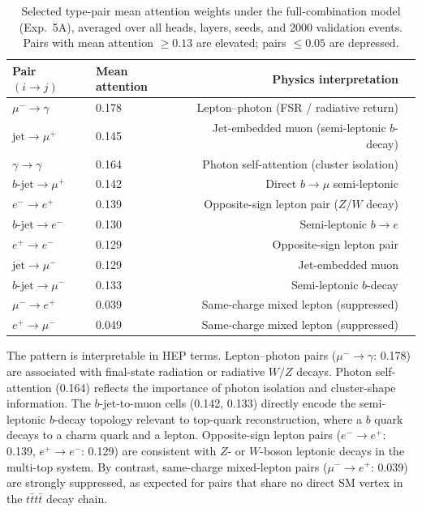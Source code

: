 \begin{table}[h]
\centering\small
\begin{tabular}{llrl}
\toprule
Pair $(i \to j)$ & Mean attention & Physics interpretation \\
\midrule
$\mu^- \to \gamma$   & 0.178 & Lepton--photon (FSR / radiative return) \\
$\text{jet} \to \mu^+$  & 0.145 & Jet-embedded muon (semi-leptonic $b$-decay) \\
$\gamma \to \gamma$  & 0.164 & Photon self-attention (cluster isolation) \\
$b\text{-jet} \to \mu^+$ & 0.142 & Direct $b \to \mu$ semi-leptonic \\
$e^- \to e^+$        & 0.139 & Opposite-sign lepton pair ($Z$/$W$ decay) \\
$b\text{-jet} \to e^-$ & 0.130 & Semi-leptonic $b \to e$ \\
$e^+ \to e^-$        & 0.129 & Opposite-sign lepton pair \\
$\text{jet} \to \mu^-$ & 0.129 & Jet-embedded muon \\
$b\text{-jet} \to \mu^-$ & 0.133 & Semi-leptonic $b$-decay \\
\midrule
$\mu^- \to e^+$      & 0.039 & Same-charge mixed lepton (suppressed) \\
$e^+ \to \mu^-$      & 0.049 & Same-charge mixed lepton (suppressed) \\
\bottomrule
\end{tabular}
\caption{Selected type-pair mean attention weights under the full-combination
model (Exp.\ 5A), averaged over all heads, layers, seeds, and 2000
validation events. Pairs with mean attention $\geq 0.13$ are elevated;
pairs $\leq 0.05$ are depressed.}
\label{tab:5a_attn}
\end{table}

The pattern is interpretable in HEP terms. Lepton--photon pairs
($\mu^- \to \gamma$: 0.178) are associated with final-state radiation or
radiative $W/Z$ decays. Photon self-attention (0.164) reflects the
importance of photon isolation and cluster-shape information. The
$b$-jet-to-muon cells (0.142, 0.133) directly encode the semi-leptonic
$b$-decay topology relevant to top-quark reconstruction, where a $b$ quark
decays to a charm quark and a lepton. Opposite-sign lepton pairs
($e^- \to e^+$: 0.139, $e^+ \to e^-$: 0.129) are consistent with $Z$- or
$W$-boson leptonic decays in the multi-top system. By contrast, same-charge
mixed-lepton pairs ($\mu^- \to e^+$: 0.039) are strongly suppressed, as
expected for pairs that share no direct SM vertex in the $t\bar{t}t\bar{t}$
decay chain.

